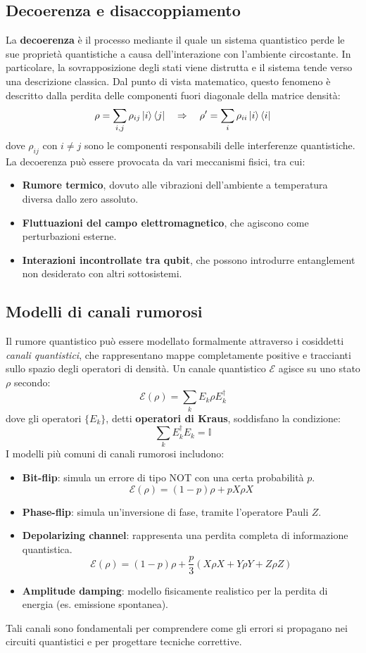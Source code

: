 \documentclass[a4paper,12pt]{report}
\theoremstyle{plain}
\begin{document}
\subsection{Decoerenza e disaccoppiamento}
La \textbf{decoerenza} è il processo mediante il quale un sistema quantistico perde le sue proprietà quantistiche a causa dell'interazione con l'ambiente circostante. In particolare, la sovrapposizione degli stati viene distrutta e il sistema tende verso una descrizione classica. Dal punto di vista matematico, questo fenomeno è descritto dalla perdita delle componenti fuori diagonale della matrice densità:
\[
\rho = \sum_{i,j} \rho_{ij} \ket{i}\bra{j} \quad \Rightarrow \quad \rho' = \sum_i \rho_{ii} \ket{i}\bra{i}
\]
dove $\rho_{ij}$ con $i \neq j$ sono le componenti responsabili delle interferenze quantistiche.
La decoerenza può essere provocata da vari meccanismi fisici, tra cui:
\begin{itemize}
  \item \textbf{Rumore termico}, dovuto alle vibrazioni dell'ambiente a temperatura diversa dallo zero assoluto.
  \item \textbf{Fluttuazioni del campo elettromagnetico}, che agiscono come perturbazioni esterne.
  \item \textbf{Interazioni incontrollate tra qubit}, che possono introdurre entanglement non desiderato con altri sottosistemi.
\end{itemize}
\subsection{Modelli di canali rumorosi}
Il rumore quantistico può essere modellato formalmente attraverso i cosiddetti \textit{canali quantistici}, che rappresentano mappe completamente positive e traccianti sullo spazio degli operatori di densità. Un canale quantistico $\mathcal{E}$ agisce su uno stato $\rho$ secondo:
\[
\mathcal{E}(\rho) = \sum_k E_k \rho E_k^\dagger
\]
dove gli operatori $\{E_k\}$, detti \textbf{operatori di Kraus}, soddisfano la condizione:
\[
\sum_k E_k^\dagger E_k = \mathbb{I}
\]
I modelli più comuni di canali rumorosi includono:
\begin{itemize}
  \item \textbf{Bit-flip}: simula un errore di tipo NOT con una certa probabilità $p$.
  \[
  \mathcal{E}(\rho) = (1-p)\rho + p X \rho X
  \]
  \item \textbf{Phase-flip}: simula un'inversione di fase, tramite l'operatore Pauli $Z$.
  \item \textbf{Depolarizing channel}: rappresenta una perdita completa di informazione quantistica.
  \[
  \mathcal{E}(\rho) = (1 - p) \rho + \frac{p}{3} (X\rho X + Y\rho Y + Z\rho Z)
  \]
  \item \textbf{Amplitude damping}: modello fisicamente realistico per la perdita di energia (es. emissione spontanea).
\end{itemize}
Tali canali sono fondamentali per comprendere come gli errori si propagano nei circuiti quantistici e per progettare tecniche correttive.
\end{document}
